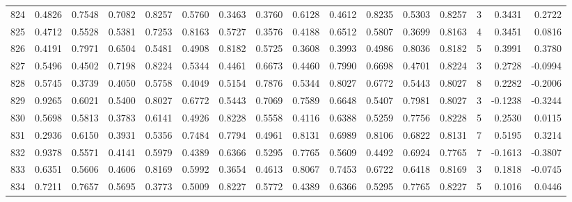 \begin{tabular}{lrrrrrrrrrrrrrrr}
824 &      0.4826 &  0.7548 &  0.7082 &  0.8257 &  0.5760 &  0.3463 &  0.3760 &  0.6128 &  0.4612 &  0.8235 &   0.5303 &     0.8257 &      3 &                    0.3431 &                     0.2722 \\
825 &      0.4712 &  0.5528 &  0.5381 &  0.7253 &  0.8163 &  0.5727 &  0.3576 &  0.4188 &  0.6512 &  0.5807 &   0.3699 &     0.8163 &      4 &                    0.3451 &                     0.0816 \\
826 &      0.4191 &  0.7971 &  0.6504 &  0.5481 &  0.4908 &  0.8182 &  0.5725 &  0.3608 &  0.3993 &  0.4986 &   0.8036 &     0.8182 &      5 &                    0.3991 &                     0.3780 \\
827 &      0.5496 &  0.4502 &  0.7198 &  0.8224 &  0.5344 &  0.4461 &  0.6673 &  0.4460 &  0.7990 &  0.6698 &   0.4701 &     0.8224 &      3 &                    0.2728 &                    -0.0994 \\
828 &      0.5745 &  0.3739 &  0.4050 &  0.5758 &  0.4049 &  0.5154 &  0.7876 &  0.5344 &  0.8027 &  0.6772 &   0.5443 &     0.8027 &      8 &                    0.2282 &                    -0.2006 \\
829 &      0.9265 &  0.6021 &  0.5400 &  0.8027 &  0.6772 &  0.5443 &  0.7069 &  0.7589 &  0.6648 &  0.5407 &   0.7981 &     0.8027 &      3 &                   -0.1238 &                    -0.3244 \\
830 &      0.5698 &  0.5813 &  0.3783 &  0.6141 &  0.4926 &  0.8228 &  0.5558 &  0.4116 &  0.6388 &  0.5259 &   0.7756 &     0.8228 &      5 &                    0.2530 &                     0.0115 \\
831 &      0.2936 &  0.6150 &  0.3931 &  0.5356 &  0.7484 &  0.7794 &  0.4961 &  0.8131 &  0.6989 &  0.8106 &   0.6822 &     0.8131 &      7 &                    0.5195 &                     0.3214 \\
832 &      0.9378 &  0.5571 &  0.4141 &  0.5979 &  0.4389 &  0.6366 &  0.5295 &  0.7765 &  0.5609 &  0.4492 &   0.6924 &     0.7765 &      7 &                   -0.1613 &                    -0.3807 \\
833 &      0.6351 &  0.5606 &  0.4606 &  0.8169 &  0.5992 &  0.3654 &  0.4613 &  0.8067 &  0.7453 &  0.6722 &   0.6418 &     0.8169 &      3 &                    0.1818 &                    -0.0745 \\
834 &      0.7211 &  0.7657 &  0.5695 &  0.3773 &  0.5009 &  0.8227 &  0.5772 &  0.4389 &  0.6366 &  0.5295 &   0.7765 &     0.8227 &      5 &                    0.1016 &                     0.0446 \\

\end{tabular}
